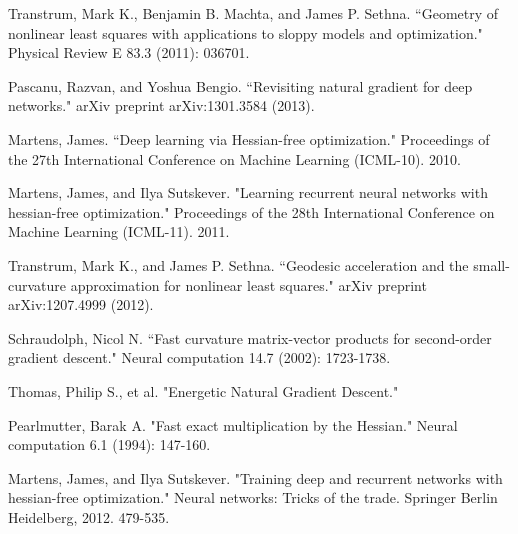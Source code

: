 \documentclass{amsart}
\theoremstyle{definition}
\theoremstyle{remark}
\numberwithin{equation}{section}
\begin{document}
\begin{thebibliography}{10}

 Transtrum, Mark K., Benjamin B. Machta, and James P. Sethna. ``Geometry of nonlinear least squares with applications to sloppy models and optimization." Physical Review E 83.3 (2011): 036701.

 Pascanu, Razvan, and Yoshua Bengio. ``Revisiting natural gradient for deep networks." arXiv preprint arXiv:1301.3584 (2013).

 Martens, James. ``Deep learning via Hessian-free optimization." Proceedings of the 27th International Conference on Machine Learning (ICML-10). 2010.

 Martens, James, and Ilya Sutskever. "Learning recurrent neural networks with hessian-free optimization." Proceedings of the 28th International Conference on Machine Learning (ICML-11). 2011.

 Transtrum, Mark K., and James P. Sethna. ``Geodesic acceleration and the small-curvature approximation for nonlinear least squares." arXiv preprint arXiv:1207.4999 (2012).

 Schraudolph, Nicol N. ``Fast curvature matrix-vector products for second-order gradient descent." Neural computation 14.7 (2002): 1723-1738.

 Thomas, Philip S., et al. "Energetic Natural Gradient Descent."

 Pearlmutter, Barak A. "Fast exact multiplication by the Hessian." Neural computation 6.1 (1994): 147-160.

 Martens, James, and Ilya Sutskever. "Training deep and recurrent networks with hessian-free optimization." Neural networks: Tricks of the trade. Springer Berlin Heidelberg, 2012. 479-535.
\end{thebibliography}
\end{document}
